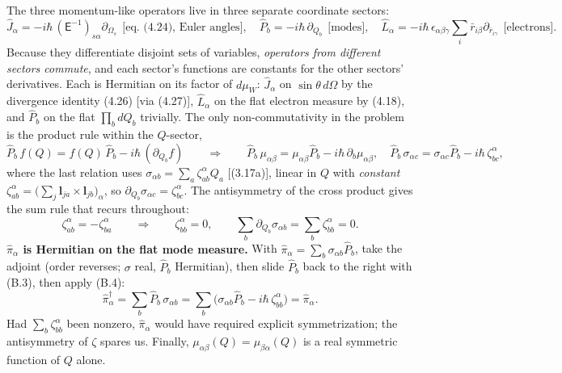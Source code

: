 The three momentum-like operators live in three separate coordinate sectors:
\begin{equation}
\hat J_\alpha=-i\hbar\,(\mathsf E^{-1})_{s\alpha}\partial_{\Omega_s}\ \ \text{[eq.~(4.24), Euler angles]},\quad
\hat P_b=-i\hbar\,\partial_{Q_b}\ \ \text{[modes]},\quad
\hat L_\alpha=-i\hbar\,\epsilon_{\alpha\beta\gamma}\textstyle\sum_i\bar r_{i\beta}\partial_{\bar r_{i\gamma}}\ \ \text{[electrons]}. \tag{B.2}
\end{equation}
Because they differentiate disjoint sets of variables, \emph{operators from different sectors commute}, and each sector's functions are constants for the other sectors' derivatives. Each is Hermitian on its factor of $d\mu_W$: $\hat J_\alpha$ on $\sin\theta\,d\Omega$ by the divergence identity (4.26) [via (4.27)], $\hat L_\alpha$ on the flat electron measure by (4.18), and $\hat P_b$ on the flat $\prod_bdQ_b$ trivially. The only non-commutativity in the problem is the product rule within the $Q$-sector,
\begin{equation}
\hat P_b\,f(Q)=f(Q)\,\hat P_b-i\hbar\,(\partial_{Q_b}f)
\qquad\Longrightarrow\qquad
\hat P_b\,\mu_{\alpha\beta}=\mu_{\alpha\beta}\hat P_b-i\hbar\,\partial_b\mu_{\alpha\beta},\quad
\hat P_b\,\sigma_{\alpha c}=\sigma_{\alpha c}\hat P_b-i\hbar\,\zeta^{\alpha}_{bc}, \tag{B.3}
\end{equation}
where the last relation uses $\sigma_{\alpha b}=\sum_a\zeta^{\alpha}_{ab}Q_a$ [(3.17a)], linear in $Q$ with \emph{constant} $\zeta^{\alpha}_{ab}=\bigl(\sum_j\mathbf l_{ja}\times\mathbf l_{jb}\bigr)_\alpha$, so $\partial_{Q_b}\sigma_{\alpha c}=\zeta^{\alpha}_{bc}$. The antisymmetry of the cross product gives the sum rule that recurs throughout:
\begin{equation}
\zeta^{\alpha}_{ab}=-\zeta^{\alpha}_{ba}\qquad\Longrightarrow\qquad
\zeta^{\alpha}_{bb}=0,\qquad \sum_b\partial_{Q_b}\sigma_{\alpha b}=\sum_b\zeta^{\alpha}_{bb}=0 . \tag{B.4}
\end{equation}
\textbf{$\hat\pi_\alpha$ is Hermitian on the flat mode measure.} With $\hat\pi_\alpha=\sum_b\sigma_{\alpha b}\hat P_b$, take the adjoint (order reverses; $\sigma$ real, $\hat P_b$ Hermitian), then slide $\hat P_b$ back to the right with (B.3), then apply (B.4):
\begin{equation}
\hat\pi_\alpha^{\dagger}
=\sum_b\hat P_b\,\sigma_{\alpha b}
=\sum_b\bigl(\sigma_{\alpha b}\hat P_b-i\hbar\,\zeta^{\alpha}_{bb}\bigr)
=\hat\pi_\alpha . \tag{B.5}
\end{equation}
Had $\sum_b\zeta^\alpha_{bb}$ been nonzero, $\hat\pi_\alpha$ would have required explicit symmetrization; the antisymmetry of $\zeta$ spares us. Finally, $\mu_{\alpha\beta}(Q)=\mu_{\beta\alpha}(Q)$ is a real symmetric function of $Q$ alone.

